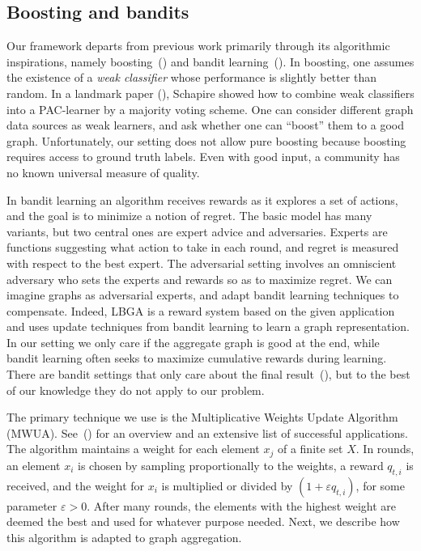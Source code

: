 \documentclass{article}
\begin{document}
\subsection{Boosting and bandits}
Our framework departs from previous work primarily through its algorithmic
inspirations, namely boosting~(\cite{Schapire90}) and bandit
learning~(\cite{Bubeck12}). In boosting, one assumes the existence of a {\em weak
classifier} whose performance is slightly better than random. In a landmark
paper (\cite{Schapire90}), Schapire showed how to combine weak classifiers into a
PAC-learner by a majority voting scheme. One can consider different graph data
sources as weak learners, and ask whether one can ``boost'' them to a good
graph. Unfortunately, our setting does not allow pure boosting because boosting
requires access to ground truth labels. Even with good input, a community has
no known universal measure of quality. 

In bandit learning an algorithm receives rewards as it explores a set of
actions, and the goal is to minimize a notion of regret. The basic model has
many variants, but two central ones are expert advice and adversaries. Experts
are functions suggesting what action to take in each round, and regret is
measured with respect to the best expert. The adversarial setting involves an
omniscient adversary who sets the experts and rewards so as to maximize regret.
We can imagine graphs as adversarial experts, and adapt bandit learning
techniques to compensate. Indeed, LBGA is a reward system based on the given
application and uses update techniques from bandit learning to learn a graph
representation. In our setting we only care if the aggregate graph is good at
the end, while bandit learning often seeks to maximize cumulative rewards
during learning. There are bandit settings that only care about the final
result~(\cite{Bubeck09}), but to the best of our knowledge they do not apply to
our problem. 

The primary technique we use is the Multiplicative Weights Update Algorithm
(MWUA). See~(\cite{Arora12}) for an overview and an extensive list of successful
applications. The algorithm maintains a weight for each element $x_j$ of a
finite set $X$. In rounds, an element $x_i$ is chosen by sampling
proportionally to the weights, a reward $q_{t,i}$ is received, and the weight
for $x_i$ is multiplied or divided by $(1 + \varepsilon q_{t,i})$, for some
parameter $\varepsilon >0$. After many rounds, the elements with the highest
weight are deemed the best and used for whatever purpose needed. Next, we
describe how this algorithm is adapted to graph aggregation. 
\end{document}
